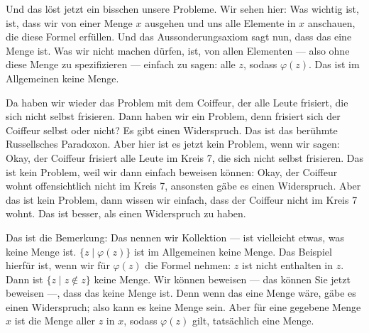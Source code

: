 \begin{spoken-clean}[00:28:41 - 00:30:51]
Und das löst jetzt ein bisschen unsere Probleme. Wir sehen hier: Was wichtig ist, ist, dass wir von einer Menge $x$ ausgehen und uns alle Elemente in $x$ anschauen, die diese Formel erfüllen. Und das Aussonderungsaxiom sagt nun, dass das eine Menge ist. Was wir nicht machen dürfen, ist, von allen Elementen --- also ohne diese Menge zu spezifizieren --- einfach zu sagen: alle $z$, sodass $\varphi(z)$. Das ist im Allgemeinen keine Menge.

Da haben wir wieder das Problem mit dem Coiffeur, der alle Leute frisiert, die sich nicht selbst frisieren. Dann haben wir ein Problem, denn frisiert sich der Coiffeur selbst oder nicht? Es gibt einen Widerspruch. Das ist das berühmte Russellsches Paradoxon. Aber hier ist es jetzt kein Problem, wenn wir sagen: Okay, der Coiffeur frisiert alle Leute im Kreis 7, die sich nicht selbst frisieren. Das ist kein Problem, weil wir dann einfach beweisen können: Okay, der Coiffeur wohnt offensichtlich nicht im Kreis 7, ansonsten gäbe es einen Widerspruch. Aber das ist kein Problem, dann wissen wir einfach, dass der Coiffeur nicht im Kreis 7 wohnt. Das ist besser, als einen Widerspruch zu haben.
\end{spoken-clean}

\begin{spoken-clean}[00:30:51 - 00:32:45]
Das ist die Bemerkung: Das nennen wir Kollektion ---  ist vielleicht etwas, was keine Menge ist. $\{ z \mid \varphi(z) \}$ ist im Allgemeinen keine Menge. Das Beispiel hierfür ist, wenn wir für $\varphi(z)$ die Formel nehmen: $z$ ist nicht enthalten in $z$. Dann ist $\{ z \mid z \notin z \}$ keine Menge. Wir können beweisen --- das können Sie jetzt beweisen ---, dass das keine Menge ist. Denn wenn das eine Menge wäre, gäbe es einen Widerspruch; also kann es keine Menge sein. Aber für eine gegebene Menge $x$ ist die Menge aller $z$ in $x$, sodass $\varphi(z)$ gilt, tatsächlich eine Menge.
\end{spoken-clean}

